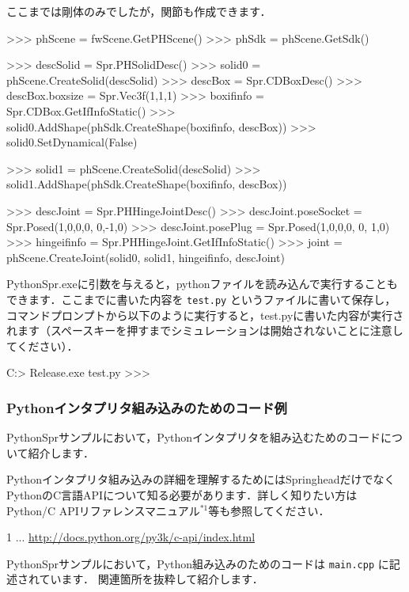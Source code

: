 \KLUDGE ここまでは剛体のみでしたが，関節も作成できます．
\begin{sourcecode}
\KLUDGE >>> phScene = fwScene.GetPHScene()
\KLUDGE >>> phSdk   = phScene.GetSdk()

\KLUDGE >>> descSolid = Spr.PHSolidDesc()
\KLUDGE >>> solid0 = phScene.CreateSolid(descSolid)
\KLUDGE >>> descBox = Spr.CDBoxDesc()
\KLUDGE >>> descBox.boxsize = Spr.Vec3f(1,1,1)
\KLUDGE >>> boxifinfo = Spr.CDBox.GetIfInfoStatic()
\KLUDGE >>> solid0.AddShape(phSdk.CreateShape(boxifinfo, descBox))
\KLUDGE >>> solid0.SetDynamical(False)

\KLUDGE >>> solid1 = phScene.CreateSolid(descSolid)
\KLUDGE >>> solid1.AddShape(phSdk.CreateShape(boxifinfo, descBox))

\KLUDGE >>> descJoint = Spr.PHHingeJointDesc()
\KLUDGE >>> descJoint.poseSocket = Spr.Posed(1,0,0,0, 0,-1,0)
\KLUDGE >>> descJoint.posePlug   = Spr.Posed(1,0,0,0, 0, 1,0)
\KLUDGE >>> hingeifinfo = Spr.PHHingeJoint.GetIfInfoStatic()
\KLUDGE >>> joint = phScene.CreateJoint(solid0, solid1, hingeifinfo, descJoint)
\end{sourcecode}


PythonSpr.exeに引数を与えると，pythonファイルを読み込んで実行することもできます．ここまでに書いた内容を \texttt{test.py} というファイルに書いて保存し，コマンドプロンプトから以下のように実行すると，test.pyに書いた内容が実行されます（スペースキーを押すまでシミュレーションは開始されないことに注意してください）．
\begin{sourcecode}
C:\src\Samples\EmbPython\PythonSpr> Release\PythonSpr.exe test.py
\KLUDGE >>>
\end{sourcecode}


\subsubsection*{Pythonインタプリタ組み込みのためのコード例}

PythonSprサンプルにおいて，Pythonインタプリタを組み込むためのコードについて紹介します．

\begin{tips}
Pythonインタプリタ組み込みの詳細を理解するためにはSpringheadだけでなくPythonのC言語APIについて知る必要があります．詳しく知りたい方はPython/C APIリファレンスマニュアル$^{*1}$等も参照してください．

{\footnotesize *1 ... \url{http://docs.python.org/py3k/c-api/index.html}}
\end{tips}

PythonSprサンプルにおいて，Python組み込みのためのコードは \texttt{main.cpp} に記述されています．
\KLUDGE 関連箇所を抜粋して紹介します．

